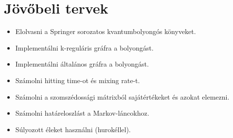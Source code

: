 \chapter{Jövőbeli tervek}

\begin{itemize}
  \item Elolvasni a Springer sorozatos kvantumbolyongós könyveket.
  \item Implementálni k-reguláris gráfra a bolyongást.
  \item Implementálni általános gráfra a bolyongást.
  \item Számolni hitting time-ot és mixing rate-t.
  \item Számolni a szomszédossági mátrixból sajátértékeket és azokat elemezni.
  \item Számolni határeloszlást a Markov-láncokhoz.
  \item Súlyozott éleket használni (hurokéllel).
\end{itemize}